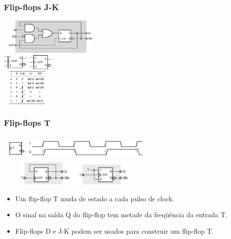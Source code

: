 \documentclass{beamer}
\begin{document}
\begin{frame}
  \frametitle{Flip-flops J-K}
 \begin{center}
  \includegraphics[height = 0.7in, width = 2in]{slide27_filomeno} \\
  \includegraphics[height = 0.3in, width = 0.5in]{slide27_filomeno2} 
  \@ \includegraphics[height = 0.3in, width = 0.5in]{slide27_filomeno3}\\
  \includegraphics[height = 0.7in, width = 1in]{slide27_filomeno4}
 \end{center} 
\end{frame}

\begin{frame}
  \frametitle{Flip-flops T}
  \begin{center}
  \includegraphics[height = 0.5in, width = 3in]{slide28_filomeno}\\
  \includegraphics[height = 0.5in, width = 3in]{slide28_filomeno2}
 \end{center} 
 \begin{itemize}
  \item Um flip-flop T muda de estado a cada pulso de clock.\pause
  \item O sinal na saída Q do flip-flop tem metade da freqüência da entrada T.\pause
  \item Flip-flops D e J-K podem ser usados para construir um flip-flop T.
 \end{itemize}
\end{frame}
\end{document}
